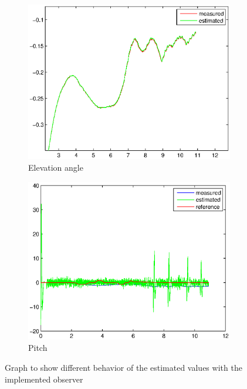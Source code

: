 \begin{figure}[H]
\graphicspath{ {Part4_pictures/}}
\begin{subfigure}{0.5\textwidth}
    \includegraphics[width=0.9\linewidth]{Part4_pictures/p4p3/estimate_comp_measured_elevation.eps} 
    \caption{Elevation angle}
\end{subfigure}
\begin{subfigure}{0.5\textwidth}
    \includegraphics[width=0.9\linewidth]{Part4_pictures/p4p3/estimate_comp_measured_pitch.eps}
    \caption{Pitch}
\end{subfigure}
\caption{Graph to show different behavior of the estimated values with the implemented observer}
\label{p4p3comp}
\end{figure}

